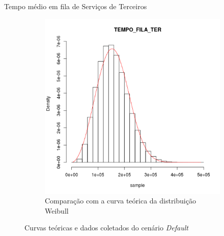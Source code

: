 \documentclass[xcolor=dvipsnames]{beamer}
\begin{document}
\begin{frame}{Tempo médio em fila de Serviços de Terceiros}
\begin{figure}[H]
\begin{subfigure}[H]{0.4\textwidth}
			\includegraphics[width=\textwidth]{img/CD-hist-weibull-TEMPO_FILA_TER.png}
			\caption{Comparação com a curva teórica da distribuição Weibull}
			\label{fig:CD-wei}
		\end{subfigure}
		\caption{Curvas teóricas e dados coletados do cenário \textit{Default}}
	\end{figure}
\end{frame}
	
\end{document}
